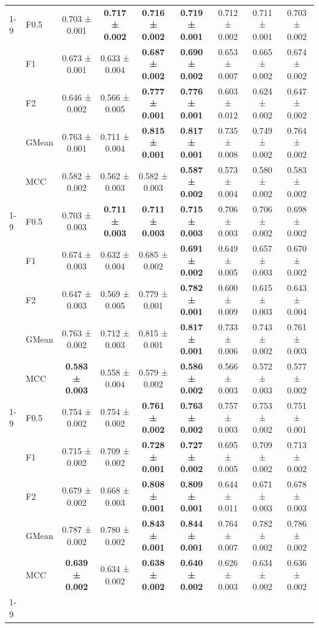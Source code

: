 \begin{table}[H]
{\begin{tabular}{llccccccc}
\cline{1-9}
\multirow[t]{5}{*}{RandomForest} & F0.5 & 0.703 ± 0.001 & \textbf{0.717 ± 0.002} & \textbf{0.716 ± 0.002} & \textbf{0.719 ± 0.001} & 0.712 ± 0.002 & 0.711 ± 0.001 & 0.703 ± 0.002 \\
 & F1 & 0.673 ± 0.001 & 0.633 ± 0.004 & \textbf{0.687 ± 0.002} & \textbf{0.690 ± 0.002} & 0.653 ± 0.007 & 0.665 ± 0.002 & 0.674 ± 0.002 \\
 & F2 & 0.646 ± 0.002 & 0.566 ± 0.005 & \textbf{0.777 ± 0.001} & \textbf{0.776 ± 0.001} & 0.603 ± 0.012 & 0.624 ± 0.002 & 0.647 ± 0.002 \\
 & GMean & 0.763 ± 0.001 & 0.711 ± 0.004 & \textbf{0.815 ± 0.001} & \textbf{0.817 ± 0.001} & 0.735 ± 0.008 & 0.749 ± 0.002 & 0.764 ± 0.002 \\
 & MCC & 0.582 ± 0.002 & 0.562 ± 0.003 & 0.582 ± 0.003 & \textbf{0.587 ± 0.002} & 0.573 ± 0.004 & 0.580 ± 0.002 & 0.583 ± 0.002 \\
\cline{1-9}
\multirow[t]{5}{*}{TabM} & F0.5 & 0.703 ± 0.003 & \textbf{0.711 ± 0.003} & \textbf{0.711 ± 0.003} & \textbf{0.715 ± 0.003} & 0.706 ± 0.003 & 0.706 ± 0.002 & 0.698 ± 0.002 \\
 & F1 & 0.674 ± 0.003 & 0.632 ± 0.004 & 0.685 ± 0.002 & \textbf{0.691 ± 0.002} & 0.649 ± 0.005 & 0.657 ± 0.003 & 0.670 ± 0.002 \\
 & F2 & 0.647 ± 0.003 & 0.569 ± 0.005 & 0.779 ± 0.001 & \textbf{0.782 ± 0.001} & 0.600 ± 0.009 & 0.615 ± 0.003 & 0.643 ± 0.004 \\
 & GMean & 0.763 ± 0.002 & 0.712 ± 0.003 & 0.815 ± 0.001 & \textbf{0.817 ± 0.001} & 0.733 ± 0.006 & 0.743 ± 0.002 & 0.761 ± 0.003 \\
 & MCC & \textbf{0.583 ± 0.003} & 0.558 ± 0.004 & 0.579 ± 0.002 & \textbf{0.586 ± 0.002} & 0.566 ± 0.003 & 0.572 ± 0.003 & 0.577 ± 0.002 \\
\cline{1-9}
\multirow[t]{5}{*}{XGBoost} & F0.5 & 0.754 ± 0.002 & 0.754 ± 0.002 & \textbf{0.761 ± 0.002} & \textbf{0.763 ± 0.002} & 0.757 ± 0.003 & 0.753 ± 0.002 & 0.751 ± 0.001 \\
 & F1 & 0.715 ± 0.002 & 0.709 ± 0.002 & \textbf{0.728 ± 0.001} & \textbf{0.727 ± 0.002} & 0.695 ± 0.005 & 0.709 ± 0.002 & 0.713 ± 0.002 \\
 & F2 & 0.679 ± 0.002 & 0.668 ± 0.003 & \textbf{0.808 ± 0.001} & \textbf{0.809 ± 0.001} & 0.644 ± 0.011 & 0.671 ± 0.003 & 0.678 ± 0.003 \\
 & GMean & 0.787 ± 0.002 & 0.780 ± 0.002 & \textbf{0.843 ± 0.001} & \textbf{0.844 ± 0.001} & 0.764 ± 0.007 & 0.782 ± 0.002 & 0.786 ± 0.002 \\
 & MCC & \textbf{0.639 ± 0.002} & 0.634 ± 0.002 & \textbf{0.638 ± 0.002} & \textbf{0.640 ± 0.002} & 0.626 ± 0.003 & 0.634 ± 0.002 & 0.636 ± 0.002 \\
\cline{1-9}
\bottomrule
\end{tabular}
    }
\end{table}
